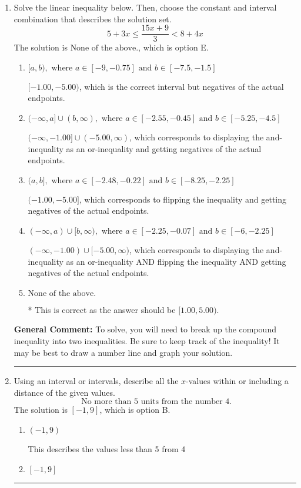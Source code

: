 \documentclass{extbook}[14pt]
\newcommand{\litem}[1]{\item #1

\rule{\textwidth}{0.4pt}}
\begin{document}
\begin{enumerate}\litem{
Solve the linear inequality below. Then, choose the constant and interval combination that describes the solution set.
\[ 5 + 3 x \leq \frac{15 x + 9}{3} < 8 + 4 x \]The solution is \( \text{None of the above.} \), which is option E.\begin{enumerate}[label=\Alph*.]
\item \( [a, b), \text{ where } a \in [-9, -0.75] \text{ and } b \in [-7.5, -1.5] \)

$[-1.00, -5.00)$, which is the correct interval but negatives of the actual endpoints.
\item \( (-\infty, a] \cup (b, \infty), \text{ where } a \in [-2.55, -0.45] \text{ and } b \in [-5.25, -4.5] \)

$(-\infty, -1.00] \cup (-5.00, \infty)$, which corresponds to displaying the and-inequality as an or-inequality and getting negatives of the actual endpoints.
\item \( (a, b], \text{ where } a \in [-2.48, -0.22] \text{ and } b \in [-8.25, -2.25] \)

$(-1.00, -5.00]$, which corresponds to flipping the inequality and getting negatives of the actual endpoints.
\item \( (-\infty, a) \cup [b, \infty), \text{ where } a \in [-2.25, -0.07] \text{ and } b \in [-6, -2.25] \)

$(-\infty, -1.00) \cup [-5.00, \infty)$, which corresponds to displaying the and-inequality as an or-inequality AND flipping the inequality AND getting negatives of the actual endpoints.
\item \( \text{None of the above.} \)

* This is correct as the answer should be $[1.00, 5.00)$.
\end{enumerate}

\textbf{General Comment:} To solve, you will need to break up the compound inequality into two inequalities. Be sure to keep track of the inequality! It may be best to draw a number line and graph your solution.
}
\litem{
Using an interval or intervals, describe all the $x$-values within or including a distance of the given values.
\[ \text{ No more than } 5 \text{ units from the number } 4. \]The solution is \( [-1, 9] \), which is option B.\begin{enumerate}[label=\Alph*.]
\item \( (-1, 9) \)

This describes the values less than 5 from 4
\item \( [-1, 9] \)


\end{enumerate}}
\end{enumerate}
\end{document}

